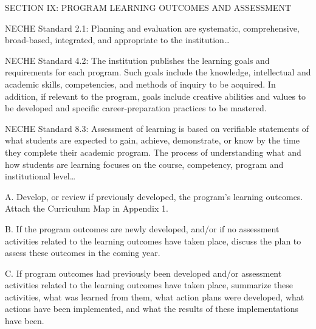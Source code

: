 SECTION IX: PROGRAM LEARNING OUTCOMES AND ASSESSMENT

NECHE Standard 2.1: Planning and evaluation are systematic, comprehensive, broad-based, integrated, and appropriate to the institution…

NECHE Standard 4.2: The institution publishes the learning goals and requirements for each program. Such goals include the knowledge, intellectual and academic skills, competencies, and methods of inquiry to be acquired. In addition, if relevant to the program, goals include creative abilities and values to be developed and specific career-preparation practices to be mastered.

NECHE Standard 8.3: Assessment of learning is based on verifiable statements of what students are expected to gain, achieve, demonstrate, or know by the time they complete their academic program. The process of understanding what and how students are learning focuses on the course, competency, program and institutional level…

A. Develop, or review if previously developed, the program’s learning outcomes. Attach the Curriculum Map in Appendix 1.




B. If the program outcomes are newly developed, and/or if no assessment activities related to the learning outcomes have taken place, discuss the plan to assess these outcomes in the coming year. 



C. If program outcomes had previously been developed and/or assessment activities related to the learning outcomes have taken place, summarize these activities, what was learned from them, what action plans were developed, what actions have been implemented, and what the results of these implementations have been. 




